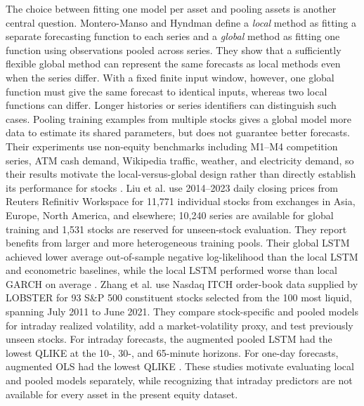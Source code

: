 \documentclass[12pt,a4paper]{article}
\numberwithin{equation}{section}
\numberwithin{table}{section}
\numberwithin{figure}{section}
\begin{document}
The choice between fitting one model per asset and pooling assets is another central question. Montero-Manso and Hyndman define a \emph{local} method as fitting a separate forecasting function to each series and a \emph{global} method as fitting one function using observations pooled across series. They show that a sufficiently flexible global method can represent the same forecasts as local methods even when the series differ. With a fixed finite input window, however, one global function must give the same forecast to identical inputs, whereas two local functions can differ. Longer histories or series identifiers can distinguish such cases. Pooling training examples from multiple stocks gives a global model more data to estimate its shared parameters, but does not guarantee better forecasts. Their experiments use non-equity benchmarks including M1--M4 competition series, ATM cash demand, Wikipedia traffic, weather, and electricity demand, so their results motivate the local-versus-global design rather than directly establish its performance for stocks \cite{monteromanso2021}. Liu et al. use 2014--2023 daily closing prices from Reuters Refinitiv Workspace for 11,771 individual stocks from exchanges in Asia, Europe, North America, and elsewhere; 10,240 series are available for global training and 1,531 stocks are reserved for unseen-stock evaluation. They report benefits from larger and more heterogeneous training pools. Their global LSTM achieved lower average out-of-sample negative log-likelihood than the local LSTM and econometric baselines, while the local LSTM performed worse than local GARCH on average \cite{liu2023}. Zhang et al. use Nasdaq ITCH order-book data supplied by LOBSTER for 93 S\&P 500 constituent stocks selected from the 100 most liquid, spanning July 2011 to June 2021. They compare stock-specific and pooled models for intraday realized volatility, add a market-volatility proxy, and test previously unseen stocks. For intraday forecasts, the augmented pooled LSTM had the lowest QLIKE at the 10-, 30-, and 65-minute horizons. For one-day forecasts, augmented OLS had the lowest QLIKE \cite{zhang2022}. These studies motivate evaluating local and pooled models separately, while recognizing that intraday predictors are not available for every asset in the present equity dataset.
\end{document}
